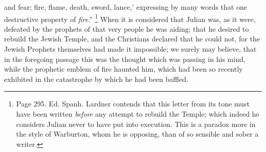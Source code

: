 and fear; fire, flame, death, sword, lance,' expressing by many words
that one destructive property of \emph{fire}.'' \footnote{Page 295. Ed. Spanh. Lardner contends that this letter from its tone
must have been written \emph{before} any attempt to rebuild the
Temple; which indeed he considers Julian never to have put into
execution. This is a paradox more in the style of Warburton, whom he
is opposing, than of so sensible and sober a writer.} When it is considered that Julian was, as it were, defeated by
the prophets of that very people he was aiding; that he desired to
rebuild the Jewish Temple, and the Christians declared that he could
not, for the Jewish Prophets themselves had made it impossible; we
surely may believe, that in the foregoing passage this was the
thought which was passing in his mind, while the prophetic emblem of
fire haunted him, which had been so recently exhibited in the
catastrophe by which he had been baffled.

